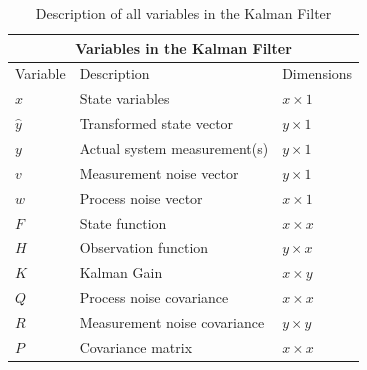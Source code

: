 \begin{center}
\begin{table}
\centering
\caption{Description of all variables in the Kalman Filter} \label{tab:sometab}
\begin{tabular}{ |p{2cm}||p{5cm}|p{2cm}| }
    \hline
    \multicolumn{3}{|c|}{Variables in the Kalman Filter } \\ 
    \hline
    Variable & Description & Dimensions \\
    \hline
    $x$ & State variables  & $x \times 1$ \\
    $\hat y$ & Transformed state vector  & $y \times 1$ \\
    $y$ & Actual system measurement(s) & $y \times 1$ \\
    $v$ & Measurement noise vector & $y \times 1$\\
    $w$ & Process noise vector & $x \times 1$\\
    $F$ & State function  & $x \times x $  \\ 
    $H$ & Observation function & $y \times x$\\
    $K$ & Kalman Gain  & $x \times y$\\
    $Q$ & Process noise covariance  & $x \times x$ \\
    $R$ & Measurement noise covariance &  $y \times y$\\
    $P$ & Covariance matrix & $x \times x $  \\ 
    \hline
\end{tabular}
\end{table}
\end{center} 

\newpage




